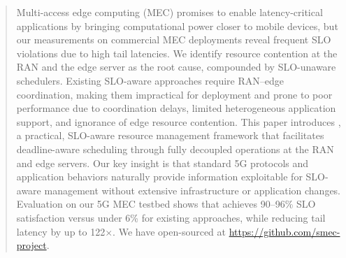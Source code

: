 \begin{abstract}
Multi-access edge computing (MEC) promises to enable latency-critical applications by bringing computational power closer to mobile devices, but our measurements on commercial MEC deployments reveal frequent SLO violations due to high tail latencies.
We identify resource contention at the RAN and the edge server as the root cause, compounded by SLO-unaware schedulers.
Existing SLO-aware approaches require RAN--edge coordination, making them impractical for deployment and prone to poor performance due to coordination delays, limited heterogeneous application support, and ignorance of edge resource contention.
This paper introduces \sys{}, a practical, SLO-aware resource management framework that facilitates deadline-aware scheduling through fully decoupled operations at the RAN and edge servers.
Our key insight is that standard 5G protocols and application behaviors naturally provide information exploitable for SLO-aware management without extensive infrastructure or application changes.
Evaluation on our 5G MEC testbed shows that \sys{} achieves 90--96\% SLO satisfaction versus under 6\% for existing approaches, while reducing tail latency by up to 122$\times$.
We have open-sourced \sys{} at \url{https://github.com/smec-project}.
\end{abstract}